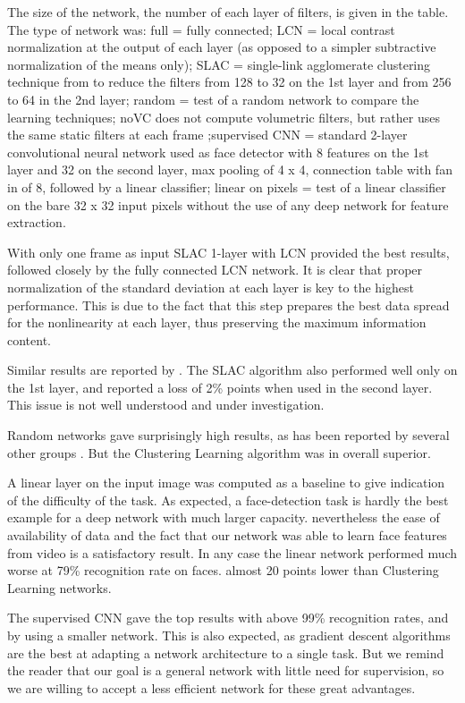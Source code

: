 \documentclass{article} %
\begin{document}
The size of the network, the number of each layer of filters,  is given in the table. The type of network was: full = fully connected; LCN = local contrast normalization at the output of each layer (as opposed to a simpler subtractive normalization of the means only); SLAC = single-link agglomerate clustering technique from \cite{coates2012learning} to reduce the filters from 128 to 32 on the 1st layer and from 256 to 64 in the 2nd layer; random = test of a random network to compare the learning techniques; noVC does not compute volumetric filters, but rather uses the same static filters at each frame ;supervised CNN = standard 2-layer convolutional neural network used as face detector with 8 features on the 1st layer and 32 on the second layer, max pooling of 4 x 4, connection table with fan in of 8, followed by a linear classifier; linear on pixels = test of a linear classifier on the bare 32 x 32 input pixels without the use of any deep network for feature extraction.

With only one frame as input SLAC 1-layer with LCN provided the best results, followed closely by the fully connected LCN network. It is clear that proper normalization of the standard deviation at each layer is key to the highest performance. This is due to the fact that this step prepares the best data spread for the nonlinearity at each layer, thus preserving the maximum information content. 

Similar results are reported by \cite{coates2012emergence}. 
The SLAC algorithm also performed well only on the 1st layer, and reported a loss of 2\% points when used in the second layer. This issue is not well understood and under investigation. 

Random networks gave surprisingly high results, as has been reported by several other groups \cite{saxe2011random}. But the Clustering Learning algorithm was in overall superior. 

A linear layer on the input image was computed as a baseline to give indication of the difficulty of the task. As expected, a face-detection task is hardly the best example for a deep network with much larger capacity. nevertheless the ease of availability of data and the fact that our network was able to learn face features from video is a satisfactory result. In any case the linear network performed much worse at 79\% recognition rate on faces. almost 20 points lower than Clustering Learning networks.

The supervised CNN gave the top results with above 99\% recognition rates, and by using a smaller network. This is also expected, as gradient descent algorithms are the best at adapting a network architecture to a single task. But we remind the reader that our goal is a general network with little need for supervision, so we are willing to accept a less efficient network for these great advantages. 
\end{document}
